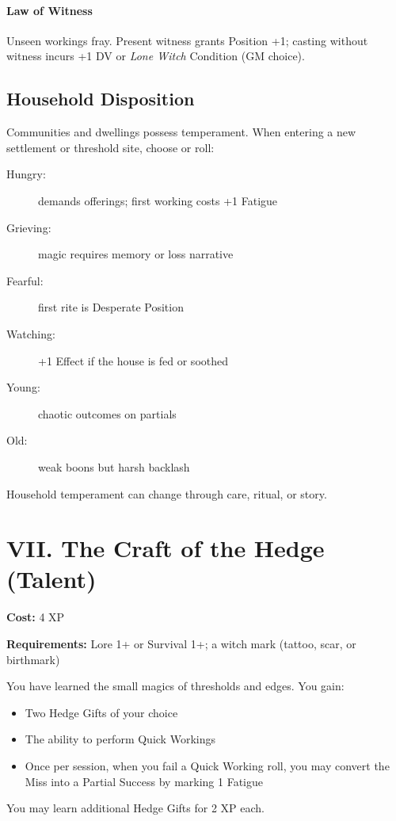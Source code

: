 \documentclass[11pt,letterpaper]{article}
\begin{document}
\paragraph{Law of Witness} Unseen workings fray. Present witness grants Position +1; casting without witness incurs +1 DV or \textit{Lone Witch} Condition (GM choice).

\subsection{Household Disposition}

Communities and dwellings possess temperament. When entering a new settlement or threshold site, choose or roll:

\begin{description}
    \item[Hungry:] demands offerings; first working costs +1 Fatigue
    \item[Grieving:] magic requires memory or loss narrative
    \item[Fearful:] first rite is Desperate Position
    \item[Watching:] +1 Effect if the house is fed or soothed
    \item[Young:] chaotic outcomes on partials
    \item[Old:] weak boons but harsh backlash
\end{description}

Household temperament can change through care, ritual, or story.

\section{VII. The Craft of the Hedge (Talent)}

\begin{tcolorbox}[colback=black!3,colframe=black!60,title=Talent: Craft of the Hedge,breakable]
\textbf{Cost:} 4 XP

\textbf{Requirements:} Lore 1+ or Survival 1+; a witch mark (tattoo, scar, or birthmark)

You have learned the small magics of thresholds and edges. You gain:
\begin{itemize}
    \item Two Hedge Gifts of your choice
    \item The ability to perform Quick Workings
    \item Once per session, when you fail a Quick Working roll, you may convert the Miss into a Partial Success by marking 1 Fatigue
\end{itemize}
You may learn additional Hedge Gifts for 2 XP each.
\end{tcolorbox}
\end{document}
